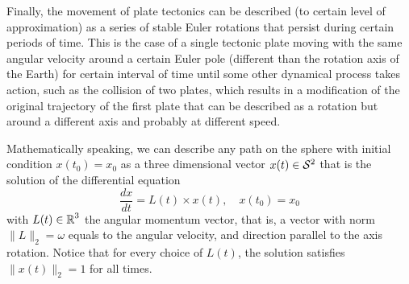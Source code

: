 Finally, the movement of plate tectonics can be described (to certain level of approximation) as a series of stable Euler rotations that persist during certain periods of time.
This is the case of a single tectonic plate moving with the same angular velocity around a certain Euler pole (different than the rotation axis of the Earth) for certain interval of time until some other dynamical process takes action, such as the collision of two plates, which results in a modification of the original trajectory of the first plate that can be described as a rotation but around a different axis and probably at different speed. 

Mathematically speaking, we can describe any path on the sphere with initial condition $x(t_0)=x_0$ as a three dimensional vector $x(t) \in \S2$ that is the solution of the differential equation 
\begin{equation}
    \frac{dx}{dt} = L(t) \times x(t),
    \quad 
    x(t_0) = x_0
\end{equation}
with $L(t) \in \operatorname{\mathbb{R}}^3$ the angular momentum vector, that is, a vector with norm $\| L \|_2 = \omega$ equals to the angular velocity, and direction parallel to the axis rotation. 
Notice that for every choice of $L(t)$, the solution satisfies $\| x(t) \|_2 = 1$ for all times.